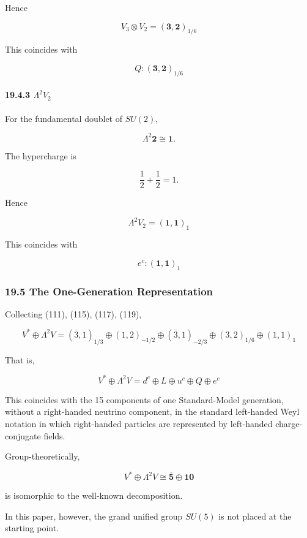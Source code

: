 \documentclass[
  a4paper,
]{article}
\begin{document}
Hence

\[
\boxed{
V_3\otimes V_2
=
(\mathbf3,\mathbf2)_{1/6}
}
\tag{117}
\]

This coincides with

\[
\boxed{
Q
:
(\mathbf3,\mathbf2)_{1/6}
}
\tag{118}
\]

\paragraph{\texorpdfstring{19.4.3
\(\Lambda^2V_2\)}{19.4.3 \textbackslash Lambda\^{}2V\_2}}\label{lambda2v_2}

For the fundamental doublet of \(SU(2)\),

\[
\Lambda^2\mathbf2
\cong
\mathbf1.
\]

The hypercharge is

\[
\frac12+\frac12=1.
\]

Hence

\[
\boxed{
\Lambda^2V_2
=
(\mathbf1,\mathbf1)_1
}
\tag{119}
\]

This coincides with

\[
\boxed{
e^c
:
(\mathbf1,\mathbf1)_1
}
\tag{120}
\]

\subsubsection{19.5 The One-Generation
Representation}\label{the-one-generation-representation}

Collecting (111), (115), (117), (119),

\[
\boxed{
V^*\oplus\Lambda^2V
=
(\overline3,1)_{1/3}
\oplus
(1,2)_{-1/2}
\oplus
(\overline3,1)_{-2/3}
\oplus
(3,2)_{1/6}
\oplus
(1,1)_1
}
\tag{121}
\]

That is,

\[
\boxed{
V^*\oplus\Lambda^2V
=
d^c\oplus L\oplus u^c\oplus Q\oplus e^c
}
\tag{122}
\]

This coincides with the 15 components of one Standard-Model generation,
without a right-handed neutrino component, in the standard left-handed
Weyl notation in which right-handed particles are represented by
left-handed charge-conjugate fields.

Group-theoretically,

\[
\boxed{
V^*\oplus\Lambda^2V
\cong
\overline{\mathbf5}
\oplus
\mathbf{10}
}
\tag{123}
\]

is isomorphic to the well-known decomposition.

In this paper, however, the grand unified group \(SU(5)\) is not placed
at the starting point.
\end{document}
